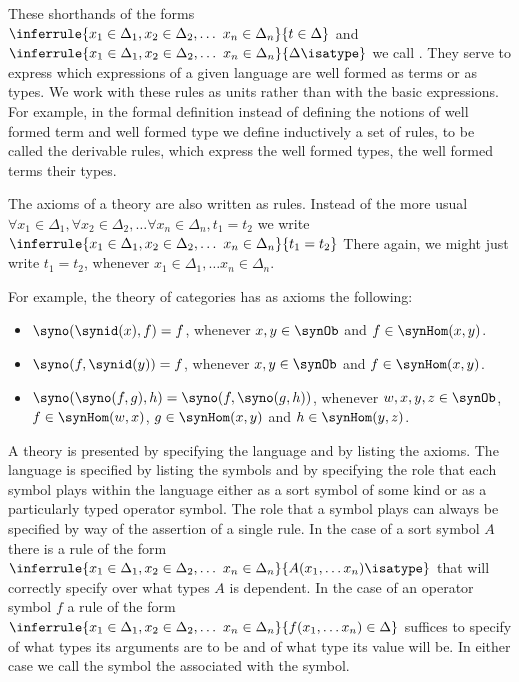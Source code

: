 These shorthands of the forms
%
$\inferrule
{ x_1 \in \Delta_1, x_2 \in \Delta_2, \ldots\ x_n \in \Delta_n }
{ t \in \Delta } $
%
and
%
$\inferrule
{ x_1 \in \Delta_1, x_2 \in \Delta_2, \ldots\ x_n \in \Delta_n }
{ \Delta \isatype } $
%
we call .
%
They serve to express which expressions of a given language are well formed as terms or as types.
%
We work with these rules as units rather than with the basic expressions.
%
For example, in the formal definition instead of defining the notions of well formed term and well formed type we define inductively a set of rules, to be called the derivable rules, which express the well formed types, the well formed terms their types.

The axioms of a theory are also written as rules.
%
Instead of the more usual $\forall x_1 \in \Delta_1, \forall x_2 \in \Delta_2, \ldots \forall x_n \in \Delta_n, t_1 = t_2$ we write
%
$\inferrule
{ x_1 \in \Delta_1, x_2 \in \Delta_2, \ldots\ x_n \in \Delta_n }
{ t_1 = t_2 } $
%
There again, we might just write $t_1 = t_2$, whenever $x_1 \in \Delta_1, \ldots x_n \in \Delta_n$.

For example, the theory of categories has as axioms the following:
%
\begin{itemize}
  \item $\syno(\synid(x),f) = f$, whenever $x,y \in \synOb$ and $f \in \synHom(x,y)$.
  \item $\syno(f,\synid(y)) = f$, whenever $x,y \in \synOb$ and $f \in \synHom(x,y)$.
  \item $\syno(\syno(f,g),h) = \syno(f,\syno(g,h))$, whenever $w,x,y,z \in \synOb$, $f \in \synHom(w,x)$, $g \in \synHom(x,y)$ and $h \in \synHom(y,z)$.
\end{itemize}


A theory is presented by specifying the language and by listing the axioms.
%
The language is specified by listing the symbols and by specifying the role that each symbol plays within the language either as a sort symbol of some kind or as a particularly typed operator symbol.
%
The role that a symbol plays can always be specified by way of the assertion of a single rule.
%
In the case of a sort symbol $A$ there is a rule of the form
%
$\inferrule
{ x_1 \in \Delta_1, x_2 \in \Delta_2, \ldots\ x_n \in \Delta_n }
{ A(x_1,\ldots x_n) \isatype } $
%
that will correctly specify over what types $A$ is dependent.
%
In the case of an operator symbol $f$ a rule of the form
%
$\inferrule
{ x_1 \in \Delta_1, x_2 \in \Delta_2, \ldots\ x_n \in \Delta_n }
{ f(x_1,\ldots x_n) \in \Delta } $
%
suffices to specify of what types its arguments are to be and of what type its value will be.
%
In either case we call the symbol the  associated with the symbol.

